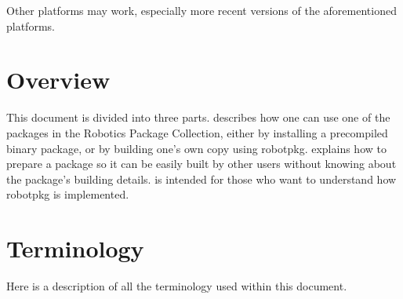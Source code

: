 Other platforms may work, especially more recent versions of the aforementioned
platforms.

\section{Overview} %

This document is divided  into three parts.  
describes how  one  can  use  one of   the  packages  in the  Robotics  Package
Collection, either  by installing a precompiled binary  package, or by building
one's own  copy  using  robotpkg.   
explains how  to prepare a package so  it can be  easily  built by  other users
without     knowing     about     the     package's    building        details.
 is  intended for  those   who want to
understand how robotpkg is implemented.


\section{Terminology} %

Here is a description of all the terminology used within this document.

